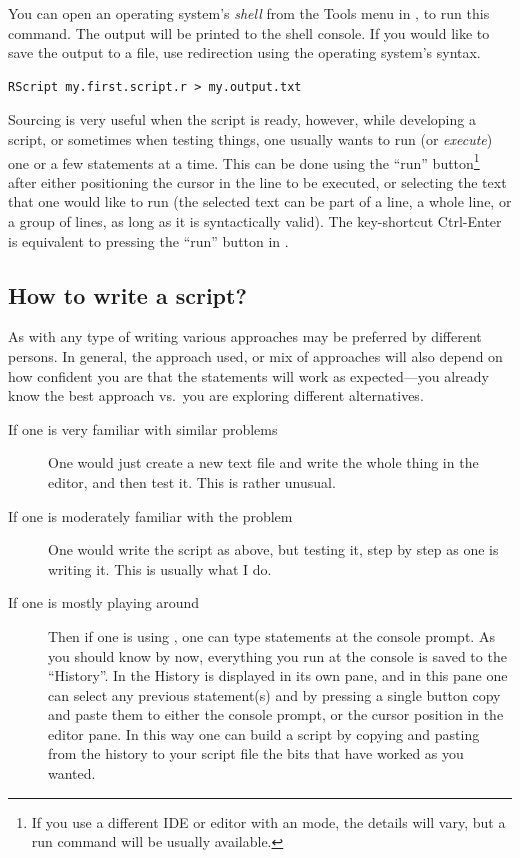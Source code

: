 \documentclass[krantz2]{krantz}\usepackage{knitr}%
\begin{document}
You can open an operating system's \emph{shell} from the Tools menu in \RStudio, to run this command. The output will be printed to the shell console. If you would like to save the output to a file, use redirection using the operating system's syntax.
\begin{shaded}
\footnotesize
\begin{verbatim}
RScript my.first.script.r > my.output.txt
\end{verbatim}
\end{shaded}

Sourcing is very useful when the script is ready, however, while developing a script, or sometimes when testing things, one usually wants to run (or \emph{execute}) one or a few statements at a time. This can be done using the ``run'' button\footnote{If you use a different IDE or editor with an \Rlang mode, the details will vary, but a run command will be usually available.} after either positioning the cursor in the line to be executed, or selecting the text that one would like to run (the selected text can be part of a line, a whole line, or a group of lines, as long as it is syntactically valid). The key-shortcut Ctrl-Enter is equivalent to pressing the ``run'' button in \RStudio.

\subsection{How to write a script?}\label{sec:script:writing}

As with any type of writing various approaches may be preferred by different persons. In general, the approach used, or mix of approaches will also depend on how confident you are that the statements will work as expected---you already know the best approach vs.\ you are exploring different alternatives.
\begin{description}
\item[If one is very familiar with similar problems] One would just create a new text file and write the whole thing in the editor, and then test it. This is rather unusual.
\item[If one is moderately familiar with the problem] One would write the script as above, but testing it, step by step as one is writing it. This is usually what I do.
\item[If one is mostly playing around] Then if one is using \RStudio, one can type statements at the console prompt. As you should know by now, everything you run at the console is saved to the ``History''. In \RStudio the History is displayed in its own pane, and in this pane one can select any previous statement(s) and by pressing a single button copy and paste them to either the \Rlang console prompt, or the cursor position in the editor pane. In this way one can build a script by copying and pasting from the history to your script file the bits that have worked as you wanted.
\end{description}
\end{document}
